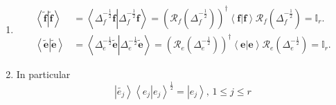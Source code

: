 \documentclass[aps,preprint]{revtex4}%
\begin{document}
\begin{enumerate}
\begin{enumerate}
\item
\begin{equation}
\left\vert \widetilde{\mathbf{f}}\right\rangle \left\langle
\widetilde{\mathbf{e}}\right\vert =\left\vert \mathbf{f}\right\rangle
\left\langle \left.  \mathbf{f}\right\vert \mathbf{f}\right\rangle ^{-\frac
{1}{2}}\left\langle \left.  \mathbf{e}\right\vert \mathbf{e}\right\rangle
^{-\frac{1}{2}}\left\langle \mathbf{e}\right\vert =\Delta_{f}^{-\frac{1}{2}%
}\left\vert \mathbf{f}\right\rangle \left\langle \mathbf{e}\right\vert
\Delta_{e}^{-\frac{1}{2}}%
\end{equation}


\item
\begin{equation}
\Delta_{f}^{\frac{1}{2}}\left\vert \widetilde{\mathbf{f}}\right\rangle
\left\langle \widetilde{\mathbf{e}}\right\vert \Delta_{e}^{\frac{1}{2}%
}=\left\vert \mathbf{f}\right\rangle \left\langle \mathbf{e}\right\vert ,
\end{equation}
which is shown by
\end{enumerate}

\item
\begin{align}
\left\langle \left.  \widetilde{\mathbf{f}}\right\vert \widetilde{\mathbf{f}%
}\right\rangle  &  =\left\langle \left.  \Delta_{f}^{-\frac{1}{2}}%
\mathbf{f}\right\vert \Delta_{f}^{-\frac{1}{2}}\mathbf{f}\right\rangle
=\left(  \mathcal{R}_{f}\left(  \Delta_{f}^{-\frac{1}{2}}\right)  \right)
^{\dagger}\left\langle \left.  \mathbf{f}\right\vert \mathbf{f}\right\rangle
\mathcal{R}_{f}\left(  \Delta_{f}^{-\frac{1}{2}}\right)  =\mathbb{I}_{r}.\\
\left\langle \left.  \widetilde{\mathbf{e}}\right\vert \widetilde{\mathbf{e}%
}\right\rangle  &  =\left\langle \left.  \Delta_{e}^{-\frac{1}{2}%
}\widetilde{\mathbf{e}}\right\vert \Delta_{e}^{-\frac{1}{2}}%
\widetilde{\mathbf{e}}\right\rangle =\left(  \mathcal{R}_{e}\left(  \Delta
_{e}^{-\frac{1}{2}}\right)  \right)  ^{\dagger}\left\langle \left.
\mathbf{e}\right\vert \mathbf{e}\right\rangle \mathcal{R}_{e}\left(
\Delta_{e}^{-\frac{1}{2}}\right)  =\mathbb{I}_{r}.
\end{align}


\item In particular
\begin{equation}
\left\vert \widetilde{e_{j}}\right\rangle \left\langle \left.  e_{j}%
\right\vert e_{j}\right\rangle ^{\frac{1}{2}}=\left\vert e_{j}\right\rangle
,\,1\leq j\leq r
\end{equation}



\end{enumerate}
\end{document}
